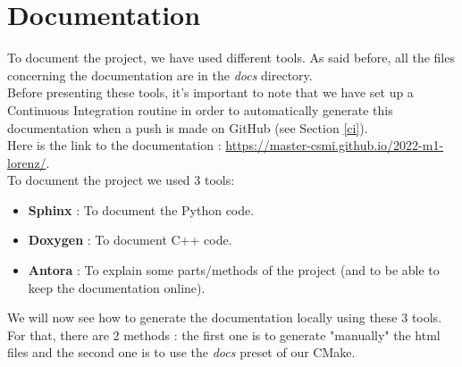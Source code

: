 \newpage

\section{Documentation}
\label{doc}

	To document the project, we have used different tools. As said before, all the files concerning the documentation are in the \textit{docs} directory. \\
	Before presenting these tools, it's important to note that we have set up a Continuous Integration routine in order to automatically generate this documentation when a push is made on GitHub (see Section \ref{ci}). \\
	Here is the link to the documentation : \url{https://master-csmi.github.io/2022-m1-lorenz/}. \\
	To document the project we used 3 tools:
	\begin{itemize}[label=-]
		\item \textbf{Sphinx\cite{sphinx_doc}} : To document the Python code. 
		\item \textbf{Doxygen\cite{doxygen_doc}} : To document C++ code.
		\item \textbf{Antora\cite{antora_doc}} : To explain some parts/methods of the project (and to be able to keep the documentation online).
	\end{itemize}
	We will now see how to generate the documentation locally using these 3 tools. For that, there are 2 methods : the first one is to generate "manually" the html files and the second one is to use the \textit{docs} preset of our CMake.
